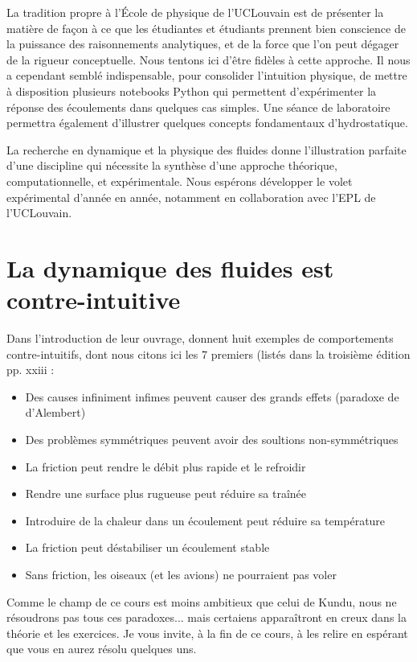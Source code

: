 La tradition propre à l'École de physique de l'UCLouvain est de présenter la matière de façon à ce que les étudiantes et étudiants prennent bien conscience de la puissance des raisonnements analytiques, et de la force que l'on peut dégager de la rigueur conceptuelle. Nous tentons ici d'être fidèles à cette approche. Il nous a cependant semblé indispensable, pour consolider l'intuition physique, de mettre à disposition plusieurs notebooks Python qui permettent d'expérimenter la réponse des écoulements dans quelques cas simples. Une séance de laboratoire permettra également d'illustrer quelques concepts fondamentaux d'hydrostatique.

La recherche en dynamique et la physique des fluides donne l'illustration parfaite d'une discipline qui nécessite la synthèse d'une approche théorique, computationnelle, et expérimentale. Nous espérons développer le volet expérimental d'année en année, notamment en collaboration avec l'EPL de l'UCLouvain. 


\section{La dynamique des fluides est contre-intuitive}

Dans  l'introduction de leur ouvrage, \cite{kundu24aa} donnent huit exemples de comportements contre-intuitifs, dont nous citons ici les 7 premiers (listés dans la troisième édition \cite{kundu04aa} pp. xxiii : 

\begin{itemize}
  \item Des causes infiniment infimes peuvent causer des grands effets (paradoxe de d'Alembert)
  \item Des problèmes symmétriques peuvent avoir des soultions non-symmétriques
  \item La friction peut rendre le débit plus rapide et le refroidir 
  \item Rendre une surface plus rugueuse peut réduire sa traînée 
  \item Introduire de la chaleur dans un écoulement peut réduire sa température
  \item La friction peut déstabiliser un écoulement stable
  \item Sans friction, les oiseaux (et les avions) ne pourraient pas voler
\end{itemize}

Comme le champ de ce cours est moins ambitieux que celui de Kundu, nous ne résoudrons pas tous ces paradoxes... mais certaiens apparaîtront en creux dans la théorie et les exercices. Je vous invite, à la fin de ce cours, à les relire en espérant que vous en aurez résolu quelques uns. 


